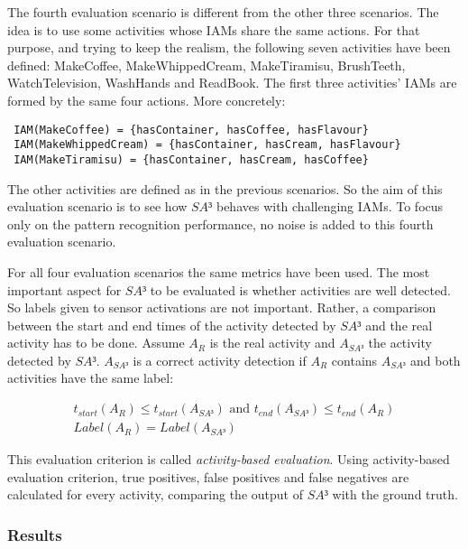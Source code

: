 The fourth evaluation scenario is different from the other three scenarios. The idea is to use some activities whose IAMs share the same actions. For that purpose, and trying to keep the realism, the following seven activities have been defined: MakeCoffee, MakeWhippedCream, MakeTiramisu, BrushTeeth, WatchTelevision, WashHands and ReadBook. The first three activities' IAMs are formed by the same four actions. More concretely:

\begin{small}
\lstset{linewidth=\textwidth}
\begin{lstlisting}
 IAM(MakeCoffee) = {hasContainer, hasCoffee, hasFlavour}
 IAM(MakeWhippedCream) = {hasContainer, hasCream, hasFlavour}
 IAM(MakeTiramisu) = {hasContainer, hasCream, hasCoffee} 
\end{lstlisting}
\end{small}

The other activities are defined as in the previous scenarios. So the aim of this evaluation scenario is to see how $SA³$ behaves with challenging IAMs. To focus only on the pattern recognition performance, no noise is added to this fourth evaluation scenario.

For all four evaluation scenarios the same metrics have been used. The most important aspect for $SA³$ to be evaluated is whether activities are well detected. So labels given to sensor activations are not important. Rather, a comparison between the start and end times of the activity detected by $SA³$ and the real activity has to be done. Assume $A_R$ is the real activity and $A_{SA³}$ the activity detected by $SA³$. $A_{SA³}$ is a correct activity detection if $A_R$ contains $A_{SA³}$ and both activities have the same label:

\begin{equation}
\begin{gathered}
 t_{start}(A_R) \leq t_{start}(A_{SA³}) \mbox{ and } t_{end}(A_{SA³}) \leq t_{end}(A_R) \\
 Label(A_R) = Label(A_{SA³})
\end{gathered}
\label{metric-sa3}
\end{equation}

This evaluation criterion is called \textit{activity-based evaluation}. Using activity-based evaluation criterion, true positives, false positives and false negatives are calculated for every activity, comparing the output of $SA³$ with the ground truth.

\subsubsection{Results}
\label{subsubsec:evaluation:sa3:results}

